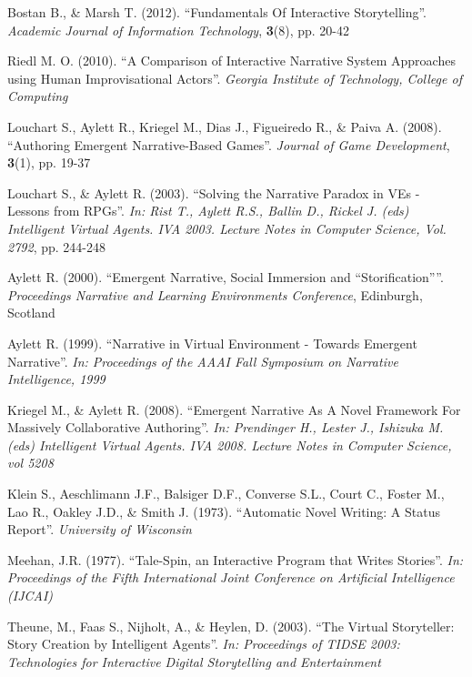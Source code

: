 \documentclass{sig-alternate-05-2015}
\begin{document}
\begin{thebibliography}{20}

Bostan B., \& Marsh T. (2012). 
``Fundamentals Of Interactive Storytelling''. 
\textit{Academic Journal of Information Technology}, \textbf{3}(8), pp. 20-42

Riedl M. O. (2010). 
``A Comparison of Interactive Narrative System Approaches using Human Improvisational Actors''.
\textit{Georgia Institute of Technology, College of Computing}

Louchart S., Aylett R., Kriegel M., Dias J., Figueiredo R., \& Paiva A. (2008).
``Authoring Emergent Narrative-Based Games''.
\textit{Journal of Game Development}, \textbf{3}(1), pp. 19-37

Louchart S., \& Aylett R. (2003).
``Solving the Narrative Paradox in VEs - Lessons from RPGs''.
\textit{In: Rist T., Aylett R.S., Ballin D., Rickel J. (eds) Intelligent Virtual Agents. IVA 2003. Lecture Notes in Computer Science, Vol. 2792}, pp. 244-248

Aylett R. (2000).
``Emergent Narrative, Social Immersion and ``Storification''''.
\textit{Proceedings Narrative and Learning Environments Conference}, Edinburgh, Scotland

Aylett R. (1999).
``Narrative in Virtual Environment - Towards Emergent Narrative''.
\textit{In: Proceedings of the AAAI Fall Symposium on Narrative Intelligence, 1999}

Kriegel M., \& Aylett R. (2008).
``Emergent Narrative As A Novel Framework For Massively Collaborative Authoring''.
\textit{In: Prendinger H., Lester J., Ishizuka M. (eds) Intelligent Virtual Agents. IVA 2008. Lecture Notes in Computer Science, vol 5208}

Klein S., Aeschlimann J.F., Balsiger D.F., Converse S.L., Court C., Foster M., Lao R., Oakley J.D., \& Smith J. (1973).
``Automatic Novel Writing: A Status Report''.
\textit{University of Wisconsin}

Meehan, J.R. (1977).
``Tale-Spin, an Interactive Program that Writes Stories''.
\textit{In: Proceedings of the Fifth International Joint Conference on Artificial Intelligence (IJCAI)}

Theune, M., Faas S., Nijholt, A., \& Heylen, D. (2003).
``The Virtual Storyteller: Story Creation by Intelligent Agents''.
\textit{In: Proceedings of TIDSE 2003: Technologies for Interactive Digital Storytelling and Entertainment}


\end{thebibliography}
\end{document}
